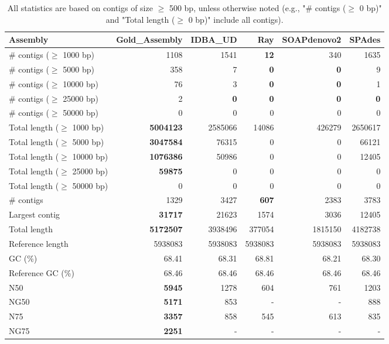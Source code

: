 \documentclass[12pt,a4paper]{article}
\begin{document}
\begin{table}[ht]
\begin{center}
\caption{All statistics are based on contigs of size $\geq$ 500 bp, unless otherwise noted (e.g., "\# contigs ($\geq$ 0 bp)" and "Total length ($\geq$ 0 bp)" include all contigs).}
\begin{tabular}{|l*{5}{|r}|}
\hline
Assembly & Gold\_Assembly & IDBA\_UD & Ray & SOAPdenovo2 & SPAdes \\ \hline
\# contigs ($\geq$ 1000 bp) & 1108 & 1541 & {\bf 12} & 340 & 1635 \\ \hline
\# contigs ($\geq$ 5000 bp) & 358 & 7 & {\bf 0} & {\bf 0} & 9 \\ \hline
\# contigs ($\geq$ 10000 bp) & 76 & 3 & {\bf 0} & {\bf 0} & 1 \\ \hline
\# contigs ($\geq$ 25000 bp) & 2 & {\bf 0} & {\bf 0} & {\bf 0} & {\bf 0} \\ \hline
\# contigs ($\geq$ 50000 bp) & 0 & 0 & 0 & 0 & 0 \\ \hline
Total length ($\geq$ 1000 bp) & {\bf 5004123} & 2585066 & 14086 & 426279 & 2650617 \\ \hline
Total length ($\geq$ 5000 bp) & {\bf 3047584} & 76315 & 0 & 0 & 66121 \\ \hline
Total length ($\geq$ 10000 bp) & {\bf 1076386} & 50986 & 0 & 0 & 12405 \\ \hline
Total length ($\geq$ 25000 bp) & {\bf 59875} & 0 & 0 & 0 & 0 \\ \hline
Total length ($\geq$ 50000 bp) & 0 & 0 & 0 & 0 & 0 \\ \hline
\# contigs & 1329 & 3427 & {\bf 607} & 2383 & 3783 \\ \hline
Largest contig & {\bf 31717} & 21623 & 1574 & 3036 & 12405 \\ \hline
Total length & {\bf 5172507} & 3938496 & 377054 & 1815150 & 4182738 \\ \hline
Reference length & 5938083 & 5938083 & 5938083 & 5938083 & 5938083 \\ \hline
GC (\%) & 68.41 & 68.31 & 68.81 & 68.21 & 68.30 \\ \hline
Reference GC (\%) & 68.46 & 68.46 & 68.46 & 68.46 & 68.46 \\ \hline
N50 & {\bf 5945} & 1278 & 604 & 761 & 1203 \\ \hline
NG50 & {\bf 5171} & 853 & - & - & 888 \\ \hline
N75 & {\bf 3357} & 858 & 545 & 613 & 835 \\ \hline
NG75 & {\bf 2251} & - & - & - & - \\ \hline

\end{tabular}
\end{center}
\end{table}
\end{document}
